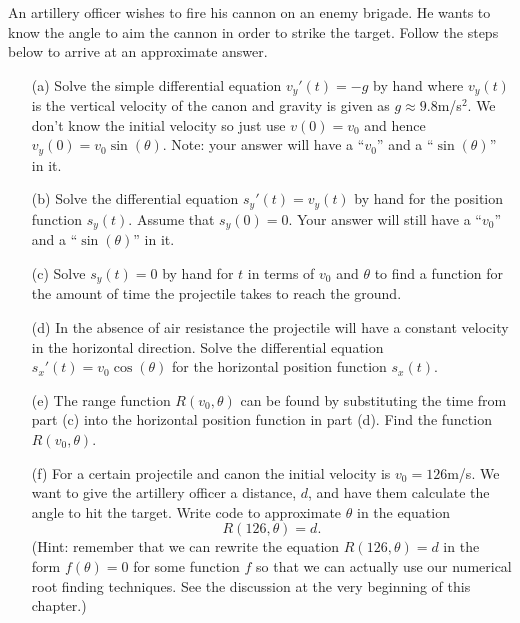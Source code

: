 \begin{problem}
    An artillery officer wishes to fire his cannon on an enemy brigade.  He wants to know
    the angle to aim the cannon in order to strike the target.  Follow the steps below to
    arrive at an approximate answer.
    \begin{enumerate}
        \item[(a)] Solve the simple differential equation $v_y'(t) = -g$ by hand where $v_y(t)$
            is the vertical velocity of the canon and gravity is given as $g \approx
            9.8$m/s$^2$.  We don't know the initial velocity so just use $v(0) = v_0$ and
            hence $v_y(0) = v_0 \sin(\theta)$. Note: your answer will have a ``$v_0$'' and a
            ``$\sin(\theta)$'' in it.
        \item[(b)] Solve the differential equation $s_y'(t) = v_y(t)$ by hand for the position
            function $s_y(t)$.  Assume that $s_y(0) = 0$.  Your answer will still have a ``$v_0$'' and a
            ``$\sin(\theta)$'' in it.
        \item[(c)] Solve $s_y(t) = 0$ by hand for $t$ in terms of $v_0$ and $\theta$ to
            find a function for the amount of time the projectile takes to reach the
            ground.
        \item[(d)] In the absence of air resistance the projectile will have a constant
            velocity in the horizontal direction.  Solve the differential equation
            $s_x'(t) = v_0 \cos(\theta)$ for the horizontal position function $s_x(t)$.  
        \item[(e)] The range function $R(v_0,\theta)$ can be found by substituting the
            time from part (c) into the horizontal position function in part (d).  Find
            the function $R(v_0,\theta)$.
        \item[(f)] For a certain projectile and canon the initial velocity is $v_0 =
            126$m/s.  We want to give the artillery officer a distance, $d$, and have them
            calculate the angle to hit the target.  Write \ProgLang code to approximate
            $\theta$ in the equation 
            \[ R(126,\theta) = d. \]
            (Hint: remember that we can rewrite the equation $R(126,\theta)=d$ in the form
            $f(\theta) = 0$ for some function $f$ so that we can actually use our
            numerical root finding techniques. See the discussion at the very beginning of
            this chapter.)


\end{enumerate}
\end{problem}
